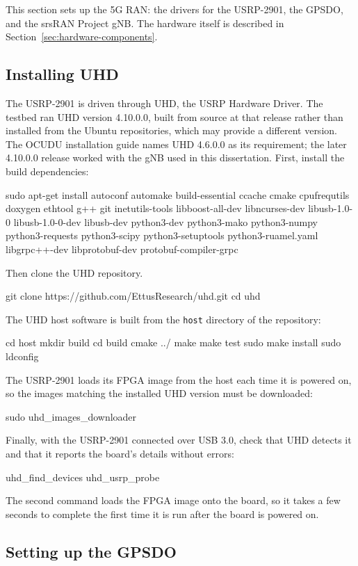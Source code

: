 This section sets up the 5G \gls{RAN}: the drivers for the USRP-2901, the \gls{GPSDO}, and the srsRAN Project \gls{gNB}. The hardware itself is described in Section~\ref{sec:hardware-components}.

\subsection{Installing UHD}
\label{sec:app-uhd}

The USRP-2901 is driven through UHD, the USRP Hardware Driver. The testbed ran UHD version 4.10.0.0, built from source at that release rather than installed from the Ubuntu repositories, which may provide a different version.
The OCUDU installation guide names UHD 4.6.0.0 as its requirement; the later 4.10.0.0 release worked with the \gls{gNB} used in this dissertation. First, install the build dependencies:
\begin{code}
sudo apt-get install autoconf automake build-essential ccache cmake cpufrequtils doxygen ethtool g++ git inetutils-tools libboost-all-dev libncurses-dev libusb-1.0-0 libusb-1.0-0-dev libusb-dev python3-dev python3-mako python3-numpy python3-requests python3-scipy python3-setuptools python3-ruamel.yaml libgrpc++-dev libprotobuf-dev protobuf-compiler-grpc
\end{code}
Then clone the UHD repository.
\begin{code}
git clone https://github.com/EttusResearch/uhd.git
cd uhd
\end{code}
The UHD host software is built from the \texttt{host} directory of the repository:
\begin{code}
cd host
mkdir build
cd build
cmake ../
make
make test
sudo make install
sudo ldconfig
\end{code}
The USRP-2901 loads its \gls{FPGA} image from the host each time it is powered on, so the images matching the installed UHD version must be downloaded:
\begin{code}
sudo uhd_images_downloader
\end{code}
Finally, with the USRP-2901 connected over USB 3.0, check that UHD detects it and that it reports the board's details without errors:
\begin{code}
uhd_find_devices
uhd_usrp_probe
\end{code}
The second command loads the \gls{FPGA} image onto the board, so it takes a few seconds to complete the first time it is run after the board is powered on.

\subsection{Setting up the GPSDO}
\label{sec:app-gpsdo}

